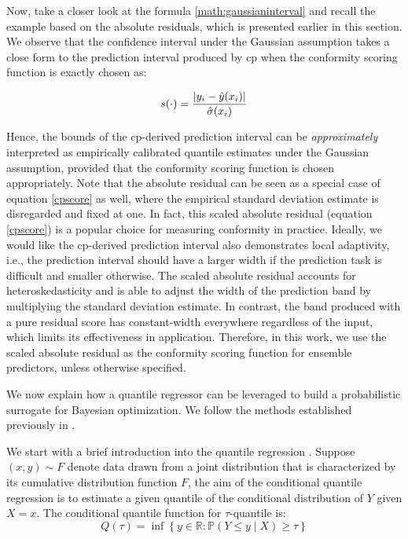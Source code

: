 {\begin{description}[leftmargin=0cm, listparindent=\parindent]
	Now, take a closer look at the formula \ref{math:gaussianinterval} and recall the example based on the absolute residuals, which is presented earlier in this section. We observe that the confidence interval under the Gaussian assumption takes a close form to the prediction interval produced by \gls{cp} when the conformity scoring function is exactly chosen as:

		\vspace{0.5em}
		\begin{equation}
			s(\cdot) = \frac{|y_i - \hat{y}(x_i)|}{\hat\sigma(x_i)}
		\label{cpscore}
		\vspace{0.7em}
		\end{equation}
	
	Hence, the bounds of the \gls{cp}-derived prediction interval can be \textit{approximately} interpreted as empirically calibrated quantile estimates under the Gaussian assumption, provided that the conformity scoring function is chosen appropriately. Note that the absolute residual can be seen as a special case of equation \ref{cpscore} as well, where the empirical standard deviation estimate is disregarded and fixed at one. In fact, this scaled absolute residual (equation \ref{cpscore}) is a popular choice for measuring conformity in practice. Ideally, we would like the \gls{cp}-derived prediction interval also demonstrates local adaptivity, i.e., the prediction interval should have a larger width if the prediction task is difficult and smaller otherwise. The scaled absolute residual accounts for heteroskedasticity and is able to adjust the width of the prediction band by multiplying the standard deviation estimate. In contrast, the band produced with a pure residual score has constant-width everywhere regardless of the input, which limits its effectiveness in application. Therefore, in this work, we use the scaled absolute residual as the conformity scoring function for ensemble predictors, unless otherwise specified.
	\vspace{0.7em}
	\item [Quantile Regressor] We now explain how a quantile regressor can be leveraged to build a probabilistic surrogate for Bayesian optimization. We follow the methods established previously in \cite{romano2019conformalized, salinas2023optimizing}.
	
	
	We start with a brief introduction into the quantile regression \cite{koenker1978regression}. Suppose $(x, y) \sim F$ denote data drawn from a joint distribution that is characterized by its cumulative distribution function $F$, the aim of the conditional quantile regression is to estimate a given quantile of the conditional distribution of $Y$ given $X=x$. The conditional quantile function for $\tau$-quantile is:
		\begin{equation}
			Q(\tau) = \inf \left\{ y \in \mathbb{R} : \mathbb{P}(Y \leq y \mid X) \geq \tau \right\}
		\label{quantilefunc}
		\end{equation}
		

\end{description}}

